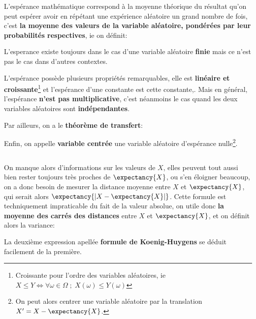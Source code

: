 L'espérance mathématique correspond à la moyenne théorique du résultat qu'on peut espérer avoir en répétant une expérience aléatoire un grand nombre de fois, c'est \textbf{la moyenne des valeurs de la variable aléatoire, pondérées par leur probabilités respectives}, ie on définit:

L'esperance existe toujours dans le cas d'une variable aléatoire \textbf{finie} mais ce n'est pas le cas dans d'autres contextes. \<

L'espérance possède plusieurs propriétés remarquables, elle est \textbf{linéaire et croissante}\footnote[1]{Croissante pour l'ordre des variables aléatoires, ie \(X \leq Y \Longleftrightarrow \forall \omega \in \Omega \; ; \; X(\omega) \leq Y(\omega)\)} et l'espérance d'une constante est cette constante,.\+
Mais en général, l'espérance \textbf{n'est pas multiplicative}, c'est néanmoins le cas quand les deux variables aléatoires sont \textbf{indépendantes}.\<

Par ailleurs, on a le \textbf{théorème de transfert}:

Enfin, on appelle \textbf{variable centrée} une variable aléatoire d'espérance nulle\footnote[2]{On peut alors centrer une variable aléatoire par la translation \(X' = X - \expectancy{X}\).}.

\subsection*{}
On manque alors d'informations sur les valeurs de \(X\), elles peuvent tout aussi bien rester toujours très
proches de \(\expectancy{X}\), ou s'en éloigner beaucoup, on a donc besoin de mesurer la distance moyenne entre \(X\) et \(\expectancy{X}\), qui serait alors \(\expectancy{| X - \expectancy{X} |}\).\+
Cette formule est techniquement impraticable du fait de la valeur absolue, on utile donc \textbf{la moyenne des carrés des distances} entre \(X\) et \(\expectancy{X}\), et on définit alors la variance:

La deuxième expression apellée \textbf{formule de Koenig-Huygens} se déduit facilement de la première.
\pagebreak


